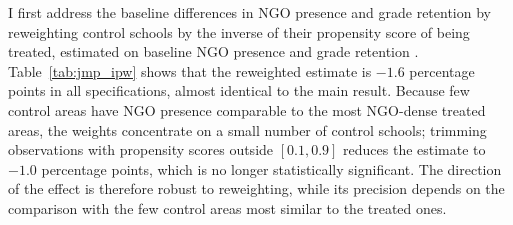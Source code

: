 \documentclass[12pt]{article}
\theoremstyle{plain}
\theoremstyle{plain}
\theoremstyle{plain}
\theoremstyle{definition}
\theoremstyle{plain}
\theoremstyle{definition}
\theoremstyle{plain}
\theoremstyle{remark}
\theoremstyle{definition}
\theoremstyle{definition}
\theoremstyle{plain}
\begin{document}
I first address the baseline differences in NGO presence and grade retention by reweighting control schools by the inverse of their propensity score of being treated, estimated on baseline NGO presence and grade retention \citep{hirano_efficient_2003}. Table~\ref{tab:jmp_ipw} shows that the reweighted estimate is $-1.6$ percentage points in all specifications, almost identical to the main result. Because few control areas have NGO presence comparable to the most NGO-dense treated areas, the weights concentrate on a small number of control schools; trimming observations with propensity scores outside $[0.1, 0.9]$ \citep{crump_dealing_2009} reduces the estimate to $-1.0$ percentage points, which is no longer statistically significant. The direction of the effect is therefore robust to reweighting, while its precision depends on the comparison with the few control areas most similar to the treated ones. \par
\medskip
\end{document}
